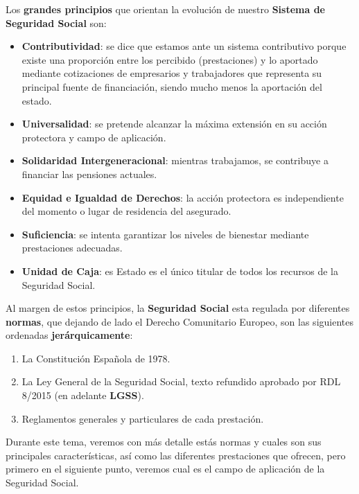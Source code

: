Los \textbf{grandes principios} que orientan la evolución de nuestro \textbf{Sistema de Seguridad Social} son:

\begin{itemize}
    \item \textbf{Contributividad}: se dice que estamos ante un sistema contributivo porque existe una proporción entre los percibido (prestaciones) y lo aportado mediante cotizaciones de empresarios y trabajadores que representa su principal fuente de financiación, siendo mucho menos la aportación del estado.

    \item \textbf{Universalidad}: se pretende alcanzar la máxima extensión en su acción protectora y campo de aplicación.

    \item \textbf{Solidaridad Intergeneracional}: mientras trabajamos, se contribuye a financiar las pensiones actuales.

    \item \textbf{Equidad e Igualdad de Derechos}: la acción protectora es independiente del momento o lugar de residencia del asegurado.

    \item \textbf{Suficiencia}: se intenta garantizar los niveles de bienestar mediante prestaciones adecuadas.

    \item \textbf{Unidad de Caja}: es Estado es el único titular de todos los recursos de la Seguridad Social.
\end{itemize}

Al margen de estos principios, la \textbf{Seguridad Social} esta regulada por diferentes \textbf{normas}, que dejando de lado el Derecho Comunitario Europeo, son las siguientes ordenadas \textbf{jerárquicamente}:

\begin{enumerate}
    \item La Constitución Española de 1978.
    \item La Ley General de la Seguridad Social, texto refundido aprobado por RDL 8/2015 (en adelante \textbf{LGSS}).
    \item Reglamentos generales y particulares de cada prestación.
\end{enumerate}

Durante este tema, veremos con más detalle estás normas y cuales son sus principales características, así como las diferentes prestaciones que ofrecen, pero primero en el siguiente punto, veremos cual es el campo de aplicación de la Seguridad Social.

